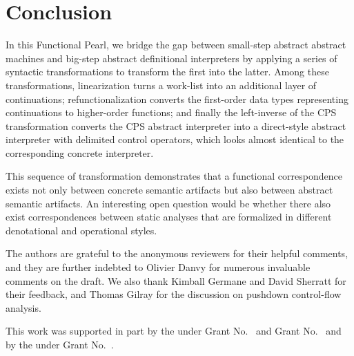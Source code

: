 \documentclass[acmsmall, review]{acmart}\settopmatter{}
\begin{document}
\section{Conclusion}\label{sec:conclusion}


In this Functional Pearl, we bridge the gap between small-step abstract abstract machines
and big-step abstract definitional interpreters by applying a series of syntactic 
transformations to transform the first into the latter. Among these transformations, 
linearization turns a work-list into an additional layer of continuations; refunctionalization 
converts the first-order data types representing continuations to higher-order functions; 
and finally the left-inverse of the CPS transformation converts the CPS abstract interpreter 
into a direct-style abstract interpreter with delimited control operators, which looks almost 
identical to the corresponding concrete interpreter.

This sequence of transformation demonstrates that a functional correspondence exists 
not only between concrete semantic artifacts but also between abstract semantic artifacts. 
An interesting open question would be whether there also exist correspondences between 
static analyses that are formalized 
in different denotational and operational styles.

\begin{acks}                            %
  The authors are grateful to the anonymous reviewers for their 
  helpful comments, and they are further indebted to Olivier Danvy 
  for numerous invaluable comments on the draft. We also thank
  Kimball Germane and David Sherratt for their feedback, and
  Thomas Gilray for the discussion on pushdown control-flow analysis.

  This work was supported in part by the
   under Grant
  No.~ and Grant
  No.~ and by the
   under Grant
  No.~.  
\end{acks}




\end{document}
